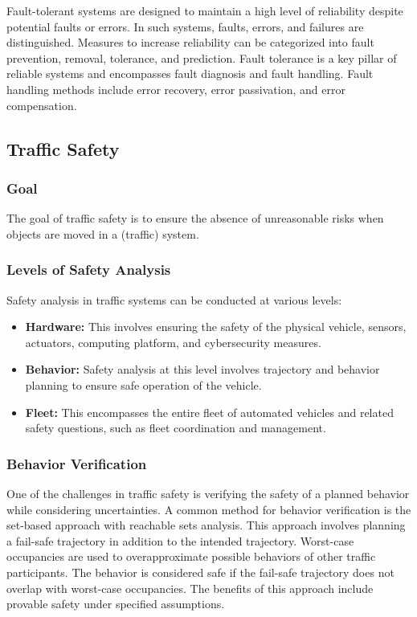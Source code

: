 Fault-tolerant systems are designed to maintain a high level of reliability despite potential faults or errors. In such systems, faults, errors, and failures are distinguished. Measures to increase reliability can be categorized into fault prevention, removal, tolerance, and prediction. Fault tolerance is a key pillar of reliable systems and encompasses fault diagnosis and fault handling. Fault handling methods include error recovery, error passivation, and error compensation.

\subsection{Traffic Safety}

\subsubsection*{Goal}
The goal of traffic safety is to ensure the absence of unreasonable risks when objects are moved in a (traffic) system.

\subsubsection*{Levels of Safety Analysis}
Safety analysis in traffic systems can be conducted at various levels:
\begin{itemize}
    \item \textbf{Hardware:} This involves ensuring the safety of the physical vehicle, sensors, actuators, computing platform, and cybersecurity measures.
    \item \textbf{Behavior:} Safety analysis at this level involves trajectory and behavior planning to ensure safe operation of the vehicle.
    \item \textbf{Fleet:} This encompasses the entire fleet of automated vehicles and related safety questions, such as fleet coordination and management.
\end{itemize}

\subsubsection*{Behavior Verification}
One of the challenges in traffic safety is verifying the safety of a planned behavior while considering uncertainties. A common method for behavior verification is the set-based approach with reachable sets analysis. This approach involves planning a fail-safe trajectory in addition to the intended trajectory. Worst-case occupancies are used to overapproximate possible behaviors of other traffic participants. The behavior is considered safe if the fail-safe trajectory does not overlap with worst-case occupancies. The benefits of this approach include provable safety under specified assumptions.

